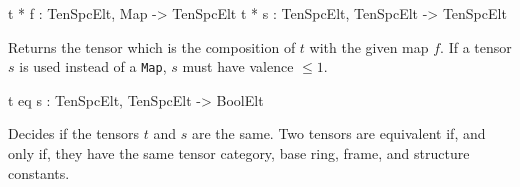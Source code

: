 \begin{intrinsics}
t * f : TenSpcElt, Map -> TenSpcElt
t * s : TenSpcElt, TenSpcElt -> TenSpcElt
\end{intrinsics}

Returns the tensor which is the composition of $t$ with the given map $f$.
If a tensor $s$ is used instead of a \texttt{Map}, $s$ must have valence $\leq 1$. 

\begin{intrinsics}
t eq s : TenSpcElt, TenSpcElt -> BoolElt
\end{intrinsics}

Decides if the tensors $t$ and $s$ are the same. 
Two tensors are equivalent if, and only if, they have the same tensor category, base ring, frame, and structure constants. 

